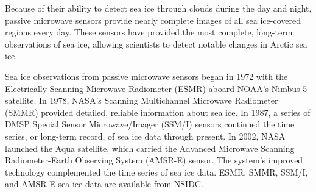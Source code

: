 Because of their ability to detect sea ice through clouds during the day and night, passive microwave sensors provide nearly complete images of all sea ice-covered regions every day. These sensors have provided the most complete, long-term observations of sea ice, allowing scientists to detect notable changes in Arctic sea ice.

Sea ice observations from passive microwave sensors began in 1972 with the Electrically Scanning Microwave Radiometer (ESMR) aboard NOAA's Nimbus-5 satellite. In 1978, NASA's Scanning Multichannel Microwave Radiometer (SMMR) provided detailed, reliable information about sea ice. In 1987, a series of DMSP Special Sensor Microwave/Imager (SSM/I) sensors continued the time series, or long-term record, of sea ice data through present. In 2002, NASA launched the Aqua satellite, which carried the Advanced Microwave Scanning Radiometer-Earth Observing System (AMSR-E) sensor. The system's improved technology complemented the time series of sea ice data. ESMR, SMMR, SSM/I, and AMSR-E sea ice data are available from NSIDC.


